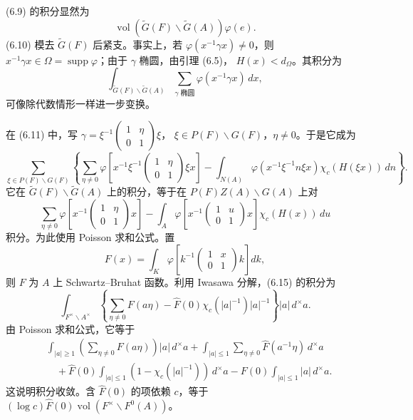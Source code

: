 (6.9) 的积分显然为
\begin{equation}
 \operatorname{vol}(\widetilde G(F)\backslash\widetilde G(A))\varphi(e).\tag{6.13}
\end{equation}
(6.10) 模去 $\widetilde G(F)$ 后紧支。事实上，若 $\varphi(x^{-1}\gamma x)\ne0$，则
$x^{-1}\gamma x\in\Omega=\operatorname{supp}\varphi$；由于 $\gamma$ 椭圆，由引理 (6.5)，
$H(x)<d_\Omega$。其积分为
\begin{equation}
 \int_{\widetilde G(F)\backslash\widetilde G(A)}
 \sum_{\gamma\text{ 椭圆}}\varphi(x^{-1}\gamma x)\,dx,\tag{6.14}
\end{equation}
可像除代数情形一样进一步变换。

在 (6.11) 中，写
$\gamma=\xi^{-1}\left(\begin{smallmatrix}1&\eta\\0&1\end{smallmatrix}\right)\xi$，
$\xi\in P(F)\backslash G(F)$，$\eta\ne0$。于是它成为
\[
 \sum_{\xi\in P(F)\backslash G(F)}\left\{
 \sum_{\eta\ne0}\varphi\!\left[x^{-1}\xi^{-1}\begin{pmatrix}1&\eta\\0&1\end{pmatrix}\xi x\right]
 -\int_{N(A)}\varphi(x^{-1}\xi^{-1}n\xi x)\chi_c(H(\xi x))\,dn\right\}.
\]
它在 $\widetilde G(F)\backslash\widetilde G(A)$ 上的积分，等于在 $P(F)Z(A)\backslash G(A)$ 上对
\begin{equation}
 \sum_{\eta\ne0}\varphi\!\left[x^{-1}\begin{pmatrix}1&\eta\\0&1\end{pmatrix}x\right]
 -\int_A\varphi\!\left[x^{-1}\begin{pmatrix}1&u\\0&1\end{pmatrix}x\right]\chi_c(H(x))\,du\tag{6.15}
\end{equation}
积分。为此使用 Poisson 求和公式。置
\begin{equation}
 F(x)=\int_K\varphi\!\left[k^{-1}\begin{pmatrix}1&x\\0&1\end{pmatrix}k\right]dk,\tag{6.16}
\end{equation}
则 $F$ 为 $A$ 上 Schwartz--Bruhat 函数。利用 Iwasawa 分解，(6.15) 的积分为
\begin{equation}
 \int_{F^\times\backslash A^\times}
 \left\{\sum_{\eta\ne0}F(a\eta)-\widehat F(0)\chi_c(|a|^{-1})|a|^{-1}\right\}|a|\,d^\times a.\tag{6.17}
\end{equation}
由 Poisson 求和公式，它等于
\[
\begin{split}
 &\int_{|a|\ge1}\left(\sum_{\eta\ne0}F(a\eta)\right)|a|\,d^\times a
 +\int_{|a|\le1}\sum_{\eta\ne0}\widehat F(a^{-1}\eta)\,d^\times a\\
 &\quad+\widehat F(0)\int_{|a|\le1}(1-\chi_c(|a|^{-1}))\,d^\times a
 -F(0)\int_{|a|\le1}|a|\,d^\times a.
\end{split}
\]
这说明积分收敛。含 $\widehat F(0)$ 的项依赖 $c$，等于
$(\log c)\widehat F(0)\operatorname{vol}(F^\times\backslash F^0(A))$。

